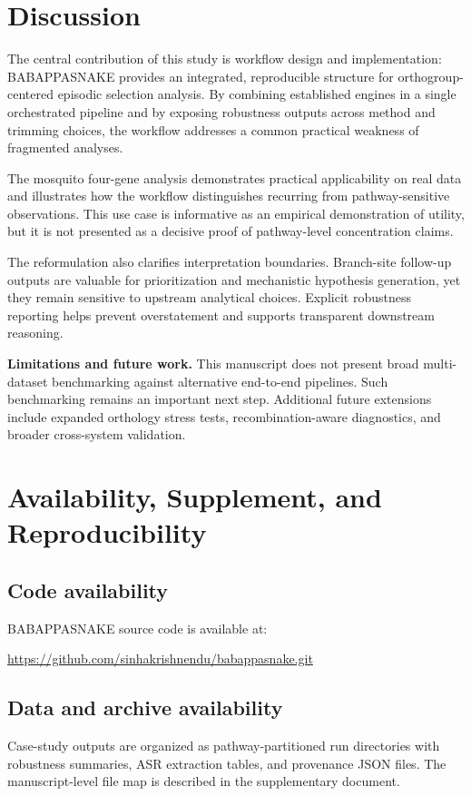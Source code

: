 \documentclass[11pt]{article}
\begin{document}
\section{Discussion}
The central contribution of this study is workflow design and implementation: BABAPPASNAKE provides an integrated, reproducible structure for orthogroup-centered episodic selection analysis.
By combining established engines in a single orchestrated pipeline and by exposing robustness outputs across method and trimming choices, the workflow addresses a common practical weakness of fragmented analyses.

The mosquito four-gene analysis demonstrates practical applicability on real data and illustrates how the workflow distinguishes recurring from pathway-sensitive observations.
This use case is informative as an empirical demonstration of utility, but it is not presented as a decisive proof of pathway-level concentration claims.

The reformulation also clarifies interpretation boundaries.
Branch-site follow-up outputs are valuable for prioritization and mechanistic hypothesis generation, yet they remain sensitive to upstream analytical choices.
Explicit robustness reporting helps prevent overstatement and supports transparent downstream reasoning.

\textbf{Limitations and future work.}
This manuscript does not present broad multi-dataset benchmarking against alternative end-to-end pipelines.
Such benchmarking remains an important next step.
Additional future extensions include expanded orthology stress tests, recombination-aware diagnostics, and broader cross-system validation.

\section{Availability, Supplement, and Reproducibility}
\subsection{Code availability}
BABAPPASNAKE source code is available at:
\begin{center}
\url{https://github.com/sinhakrishnendu/babappasnake.git}
\end{center}

\subsection{Data and archive availability}
Case-study outputs are organized as pathway-partitioned run directories with robustness summaries, ASR extraction tables, and provenance JSON files.
The manuscript-level file map is described in the supplementary document.
\end{document}
